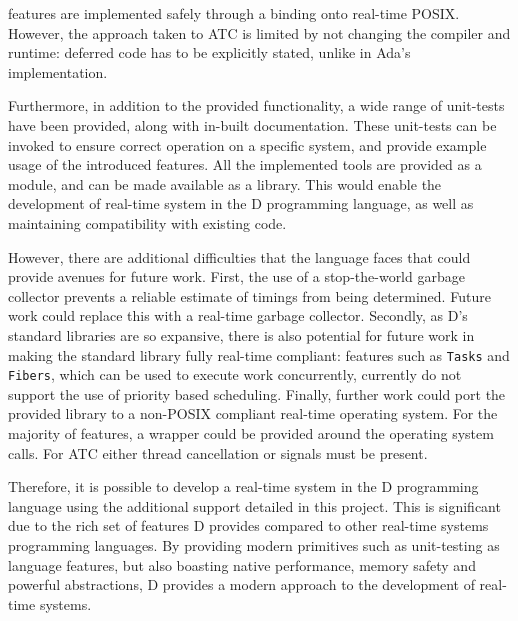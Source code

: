 features are implemented safely through a binding onto real-time POSIX.
However, the approach taken to ATC is limited by not changing the compiler and
runtime: deferred code has to be explicitly stated, unlike in Ada's implementation. 
\par\bigskip\noindent
Furthermore, in addition to the provided functionality, a wide range of unit-tests 
have been provided, along with in-built documentation. 
These unit-tests can be invoked to ensure correct operation on a specific
system, and provide example usage of the introduced features. 
All the implemented tools are provided as a module, and can be made available as 
a library. This would enable the development of real-time system in the D programming 
language, as well as maintaining compatibility with existing code. 
\par\bigskip\noindent
However, there are additional difficulties that the 
language faces that could provide avenues for future work. 
First, the use of a stop-the-world garbage collector prevents a reliable 
estimate of timings from being determined. Future work could replace this with a
real-time garbage collector. 
Secondly, as D's standard libraries are so expansive, there is also potential for future
work in making the standard library fully real-time compliant: features such as
\texttt{Tasks} and \texttt{Fibers}, which can be used to execute work
concurrently, currently do not support the use of priority based scheduling.
Finally, further work could port the provided library to a non-POSIX compliant
real-time operating system. For the majority of features, a wrapper could
be provided around the operating system calls. For ATC either thread cancellation 
or signals must be present. 
\par\bigskip\noindent
Therefore, it is possible to develop a real-time system in the D programming 
language using the additional support detailed in this project. This is
significant due to the rich set of features D provides compared to other
real-time systems programming languages. By providing modern primitives such as
unit-testing as language features, but also boasting native performance, 
memory safety and powerful abstractions, D provides a modern approach to the
development of real-time systems. 

